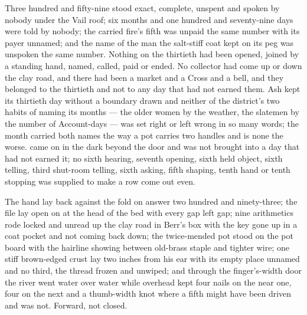 Three hundred and fifty-nine stood exact, complete, unspent and spoken by nobody under the Vail roof; six months and one hundred and seventy-nine days were told by nobody; the carried fire's fifth was unpaid the same number with its payer unnamed; and the name of the man the salt-stiff coat kept on its peg was unspoken the same number. Nothing on the thirtieth had been opened, joined by a standing hand, named, called, paid or ended. No collector had come up or down the clay road, and there had been a market and a Cross and a bell, and they belonged to the thirtieth and not to any day that had not earned them. Ash kept its thirtieth day without a boundary drawn and neither of the district's two habits of naming its months --- the older women by the weather, the slatemen by the number of Account-days --- was set right or left wrong in so many words; the month carried both names the way a pot carries two handles and is none the worse.  came on in the dark beyond the door and was not brought into a day that had not earned it; no sixth hearing, seventh opening, sixth held object, sixth telling, third shut-room telling, sixth asking, fifth shaping, tenth hand or tenth stopping was supplied to make a row come out even.

The hand lay back against the fold on answer two hundred and ninety-three; the file lay open on  at the head of the bed with every gap left gap; nine arithmetics rode locked and unread up the clay road in Berr's box with the key gone up in a coat pocket and not coming back down; the twice-mended pot stood on the pot board with the hairline showing between old-brass staple and tighter wire; one stiff brown-edged crust lay two inches from his ear with its empty place unnamed and no third, the thread frozen and unwiped; and through the finger's-width door the river went water over water while  overhead kept four nails on the near one, four on the next and a thumb-width knot where a fifth might have been driven and was not. Forward, not closed.
